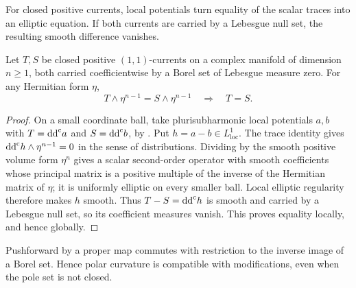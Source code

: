 For closed positive currents, local potentials turn equality of the scalar traces into an elliptic equation. If both currents are carried by a Lebesgue null set, the resulting smooth difference vanishes.

\begin{lemma}\label{lem:closed-null-current-trace}
Let $T,S$ be closed positive $(1,1)$-currents on a complex manifold of dimension $n\geq1$, both carried coefficientwise by a Borel set of Lebesgue measure zero. For any Hermitian form $\eta$,
\[
 T\wedge\eta^{n-1}=S\wedge\eta^{n-1}
 \quad\Longrightarrow\quad T=S.
\]
\end{lemma}
\begin{proof}
On a small coordinate ball, take plurisubharmonic local potentials $a,b$ with $T=\mathrm{dd}^{\mathrm{c}} a$ and $S=\mathrm{dd}^{\mathrm{c}} b$, by \cite[Chapter III, Proposition 1.19, p.~135]{DemCADG}. Put $h=a-b\in L^1_{\mathrm{loc}}$. The trace identity gives $\mathrm{dd}^{\mathrm{c}} h\wedge\eta^{n-1}=0$ in the sense of distributions. Dividing by the smooth positive volume form $\eta^n$ gives a scalar second-order operator with smooth coefficients whose principal matrix is a positive multiple of the inverse of the Hermitian matrix of $\eta$; it is uniformly elliptic on every smaller ball. Local elliptic regularity therefore makes $h$ smooth. Thus $T-S=\mathrm{dd}^{\mathrm{c}} h$ is smooth and carried by a Lebesgue null set, so its coefficient measures vanish. This proves equality locally, and hence globally.
\end{proof}

Pushforward by a proper map commutes with restriction to the inverse image of a Borel set. Hence polar curvature is compatible with modifications, even when the pole set is not closed.

